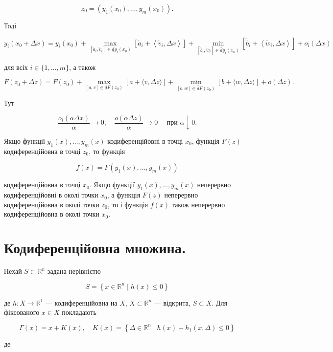 \documentclass[12pt,a4paper]{extarticle}
\numberwithin{section}{part}
\begin{document}
$$
z_{0}=\left(y_{1}\left(x_{0}\right), \ldots, y_{m}\left(x_{0}\right)\right) .
$$

Тоді

$$
y_{i}\left(x_{0}+\Delta x\right)=y_{i}\left(x_{0}\right)+\max _{\left[\widetilde{a}_{i}, \widetilde{v}_{i}\right] \in \underline{d} y_{i}\left(x_{0}\right)}\left[\widetilde{a}_{i}+\left\langle\widetilde{v}_{i}, \Delta x\right\rangle\right]+\min _{\left[\widetilde{b}_{i}, \widetilde{w}_{i}\right] \in \bar{d} y_{i}\left(x_{0}\right)}\left[\widetilde{b}_{i}+\left\langle\widetilde{w}_{i}, \Delta x\right\rangle\right]+o_{i}(\Delta x)
$$

для всіх $i \in\{1, \ldots, m\}$, а також

$$
F\left(z_{0}+\Delta z\right)=F\left(z_{0}\right)+\max _{[a, v] \in \underline{d} F\left(z_{0}\right)}[a+\langle v, \Delta z\rangle]+\min _{[b, w] \in \bar{d} F\left(z_{0}\right)}[b+\langle w, \Delta z\rangle]+o(\Delta z) .
$$

Тут

$$
\frac{o_{i}(\alpha \Delta x)}{\alpha} \rightarrow 0, \quad \frac{o(\alpha \Delta z)}{\alpha} \rightarrow 0 \quad \text { при } \alpha \downarrow 0 .
$$

Якщо функції $y_{1}(x), \ldots, y_{m}(x)$ кодиференційовні в точці $x_{0}$, функція $F(z)$ кодиференційовна в точці $z_{0}$, то функція

$$
f(x)=F\left(y_{1}(x), \ldots, y_{m}(x)\right)
$$

кодиференційовна в точці $x_{0}$. Якщо функції $y_{1}(x), \ldots, y_{m}(x)$ неперервно кодиференційовні в околі точки $x_{0}$, а функція $F(z)$ неперервно кодиференційовна в околі точки $z_{0}$, то і функція $f(x)$ також неперервно кодиференційовна в околі точки $x_{0}$.

\section{Кодиференційовна множина.}
Нехай $S \subset \mathbb{R}^{n}$ задана нерівністю

$$
S=\left\{x \in \mathbb{R}^{n} \mid h(x) \leq 0\right\}
$$

де $h: X \rightarrow \mathbb{R}^{1}$ --- кодиференційовна на $X$, $X \subset \mathbb{R}^{n}$ --- відкрита, $S \subset X$. Для фіксованого $x \in X$ покладають

$$
\Gamma(x)=x+K(x), \quad K(x)=\left\{\Delta \in \mathbb{R}^{n} \mid h(x)+h_{1}(x, \Delta) \leq 0\right\}
$$

де
\end{document}

